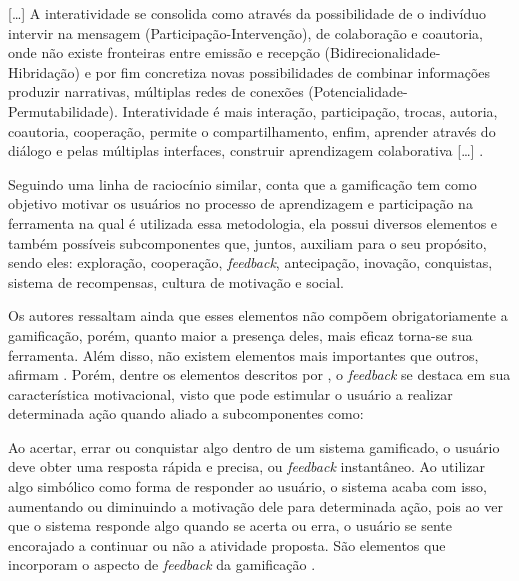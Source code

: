 \begin{citacao}

[…] A interatividade se consolida como através da possibilidade de o indivíduo intervir na mensagem (Participação-Intervenção), de colaboração e coautoria, onde não existe fronteiras entre emissão e recepção (Bidirecionalidade-Hibridação) e por fim concretiza novas possibilidades de combinar informações produzir narrativas, múltiplas redes de conexões (Potencialidade-Permutabilidade). Interatividade é mais interação, participação, trocas, autoria, coautoria, cooperação, permite o compartilhamento, enfim, aprender através do diálogo e pelas múltiplas interfaces, construir aprendizagem colaborativa […] \cite{valentim2016interatividade}.

\end{citacao}
Seguindo uma linha de raciocínio similar,  conta que a gamificação tem como objetivo motivar os usuários no processo de aprendizagem e participação na ferramenta na qual é utilizada essa metodologia, ela possui diversos elementos e também possíveis subcomponentes que, juntos, auxiliam para o seu propósito, sendo eles: exploração, cooperação, \textit{feedback}, antecipação, inovação, conquistas, sistema de recompensas, cultura de motivação e social. 

Os autores ressaltam ainda que esses elementos não compõem obrigatoriamente a gamificação, porém, quanto maior a presença deles, mais eficaz torna-se sua ferramenta. Além disso, não existem elementos mais importantes que outros, afirmam . Porém, dentre os elementos descritos por , o  \textit{feedback}  se destaca em sua característica motivacional, visto que pode estimular o usuário a realizar determinada ação quando aliado a subcomponentes como:

\begin{citacao}

Ao acertar, errar ou conquistar algo dentro de um sistema gamificado, o usuário deve obter uma resposta rápida e precisa, ou \textit{feedback} instantâneo. Ao utilizar algo simbólico como forma de responder ao usuário, o sistema acaba com isso, aumentando ou diminuindo a motivação dele para determinada ação, pois ao ver que o sistema responde algo quando se acerta ou erra, o usuário se sente encorajado a continuar ou não a atividade proposta. São elementos que incorporam o aspecto de \textit{feedback} da gamificação \cite{costa2018revisao}.

\end{citacao}


